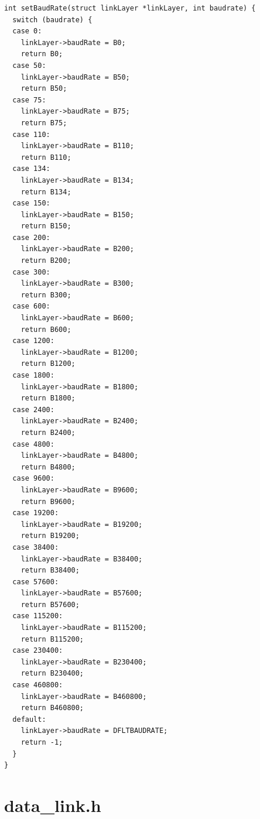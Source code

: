 \documentclass[11pt]{report}
\begin{document}
\begin{lstlisting}
int setBaudRate(struct linkLayer *linkLayer, int baudrate) {
  switch (baudrate) {
  case 0:
    linkLayer->baudRate = B0;
    return B0;
  case 50:
    linkLayer->baudRate = B50;
    return B50;
  case 75:
    linkLayer->baudRate = B75;
    return B75;
  case 110:
    linkLayer->baudRate = B110;
    return B110;
  case 134:
    linkLayer->baudRate = B134;
    return B134;
  case 150:
    linkLayer->baudRate = B150;
    return B150;
  case 200:
    linkLayer->baudRate = B200;
    return B200;
  case 300:
    linkLayer->baudRate = B300;
    return B300;
  case 600:
    linkLayer->baudRate = B600;
    return B600;
  case 1200:
    linkLayer->baudRate = B1200;
    return B1200;
  case 1800:
    linkLayer->baudRate = B1800;
    return B1800;
  case 2400:
    linkLayer->baudRate = B2400;
    return B2400;
  case 4800:
    linkLayer->baudRate = B4800;
    return B4800;
  case 9600:
    linkLayer->baudRate = B9600;
    return B9600;
  case 19200:
    linkLayer->baudRate = B19200;
    return B19200;
  case 38400:
    linkLayer->baudRate = B38400;
    return B38400;
  case 57600:
    linkLayer->baudRate = B57600;
    return B57600;
  case 115200:
    linkLayer->baudRate = B115200;
    return B115200;
  case 230400:
    linkLayer->baudRate = B230400;
    return B230400;
  case 460800:
    linkLayer->baudRate = B460800;
    return B460800;
  default:
    linkLayer->baudRate = DFLTBAUDRATE;
    return -1;
  }
}
\end{lstlisting}

\section{data\_link.h}
\end{document}
